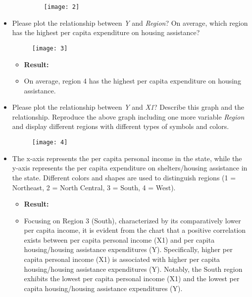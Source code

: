 \documentclass[12pt,letterpaper]{article}
\begin{document}
\begin{itemize}
\begin{itemize}
	\begin{figure}[H]
		\centering
		\texttt{[image: 2]}
	\end{figure}
\end{itemize}
\item
Please plot the relationship between \emph{Y} and \emph{Region}? On average, which region has the highest per capita expenditure on housing assistance?
\vspace{.5cm}
 
\begin{figure}[H]
	\centering
	\texttt{[image: 3]}
\end{figure}
\begin{itemize}
	\item \textbf{Result:}
	\item  On average, region 4 has the highest per capita expenditure on housing assistance.
	\\

\end{itemize}
\item
Please plot the relationship between \emph{Y} and \emph{X1}? Describe this graph and the relationship. Reproduce the above graph including one more variable \emph{Region} and display different regions with different types of symbols and colors.
\vspace{.5cm}
 
\begin{figure}[H]
	\centering
	\texttt{[image: 4]}
\end{figure}
\item The x-axis represents the per capita personal income in the state, while the y-axis represents the per capita expenditure on shelters/housing assistance in the state. Different colors and shapes are used to distinguish regions (1 = Northeast, 2 = North Central, 3 = South, 4 = West). 
\begin{itemize}
	\item\textbf{ Result:}
	\item Focusing on Region 3 (South), characterized by its comparatively lower per capita income, it is evident from the chart that a positive correlation exists between per capita personal income (X1) and per capita housing/housing assistance expenditures (Y). Specifically, higher per capita personal income (X1) is associated with higher per capita housing/housing assistance expenditures (Y). Notably, the South region exhibits the lowest per capita personal income (X1) and the lowest per capita housing/housing assistance expenditures (Y).
\end{itemize}
\end{itemize}
\end{document}
